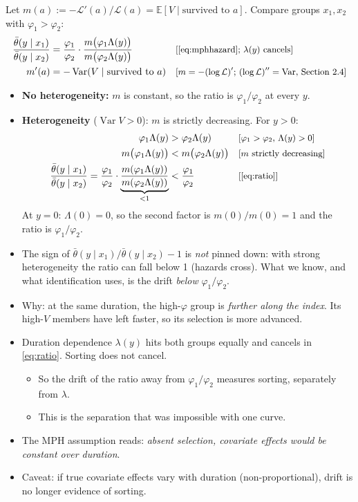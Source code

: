 \documentclass[11pt]{article}
\newcommand{\E}{\mathbb{E}}
\newcommand{\1}{\mathbf{1}}
\newcommand{\Lap}{\mathcal{L}}
\newcommand{\var}{\operatorname{Var}}
\newcommand{\why}[1]{\text{\small[#1]}}
\begin{document}
Let $m(a):=-\Lap'(a)/\Lap(a)=\E[V\mid\text{survived to }a]$. Compare groups $x_1,x_2$ with $\varphi_1>\varphi_2$:
\begin{align}
  \frac{\bar\theta(y\mid x_1)}{\bar\theta(y\mid x_2)} &= \frac{\varphi_1}{\varphi_2}\cdot\frac{m\big(\varphi_1\Lambda(y)\big)}{m\big(\varphi_2\Lambda(y)\big)} && \why{\eqref{eq:mphhazard}; $\lambda(y)$ cancels} \label{eq:ratio}\\
  m'(a) &= -\var(V\mid\text{survived to }a) && \why{$m=-(\log\Lap)'$; $(\log\Lap)''=\var$, Section 2.4} \nonumber
\end{align}
\begin{itemize}
  \item \textbf{No heterogeneity:} $m$ is constant, so the ratio is $\varphi_1/\varphi_2$ at every $y$.
  \item \textbf{Heterogeneity} ($\var V>0$): $m$ is strictly decreasing. For $y>0$:
    \begin{align}
      \varphi_1\Lambda(y) &> \varphi_2\Lambda(y) && \why{$\varphi_1>\varphi_2$, $\Lambda(y)>0$} \nonumber\\
      m\big(\varphi_1\Lambda(y)\big) &< m\big(\varphi_2\Lambda(y)\big) && \why{$m$ strictly decreasing} \nonumber\\
      \frac{\bar\theta(y\mid x_1)}{\bar\theta(y\mid x_2)} = \frac{\varphi_1}{\varphi_2}\cdot\underbrace{\frac{m(\varphi_1\Lambda(y))}{m(\varphi_2\Lambda(y))}}_{<1} &< \frac{\varphi_1}{\varphi_2} && \why{\eqref{eq:ratio}} \nonumber
    \end{align}
    At $y=0$: $\Lambda(0)=0$, so the second factor is $m(0)/m(0)=1$ and the ratio is $\varphi_1/\varphi_2$.
  \item The sign of $\bar\theta(y\mid x_1)/\bar\theta(y\mid x_2)-1$ is \emph{not} pinned down: with strong heterogeneity the ratio can fall below 1 (hazards cross). What we know, and what identification uses, is the drift \emph{below} $\varphi_1/\varphi_2$.
  \item Why: at the same duration, the high-$\varphi$ group is \emph{further along the index}. Its high-$V$ members have left faster, so its selection is more advanced.
  \item Duration dependence $\lambda(y)$ hits both groups equally and cancels in \eqref{eq:ratio}. Sorting does not cancel.
    \begin{itemize}
      \item So the drift of the ratio away from $\varphi_1/\varphi_2$ measures sorting, separately from $\lambda$.
      \item This is the separation that was impossible with one curve.
    \end{itemize}
  \item The MPH assumption reads: \emph{absent selection, covariate effects would be constant over duration}.
  \item Caveat: if true covariate effects vary with duration (non-proportional), drift is no longer evidence of sorting.
\end{itemize}
\end{document}
